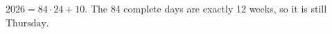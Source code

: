 $2026=84\cdot24+10$. The 84 complete days are exactly 12 weeks, so it is still $\boxed{\text{Thursday}}$.
